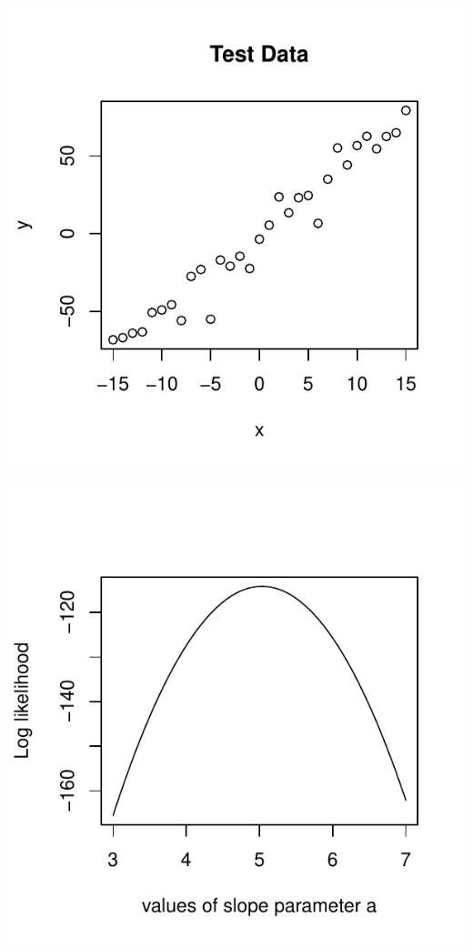 \documentclass[a4paper,10pt]{article}\usepackage[]{graphicx}\usepackage[]{color}
\makeatletter
\def\maxwidth{ %
  \ifdim\Gin@nat@width>\linewidth
    \linewidth
  \else
    \Gin@nat@width
  \fi
}
\newenvironment{knitrout}{}{} %
\makeatother
\begin{document}
\begin{knitrout}
\color{fgcolor}

{\centering \includegraphics[width=\maxwidth]{figure/setup_functions_and_parameters-1} 

}




{\centering \includegraphics[width=\maxwidth]{figure/setup_functions_and_parameters-2} 

}
\end{knitrout}
\end{document}
